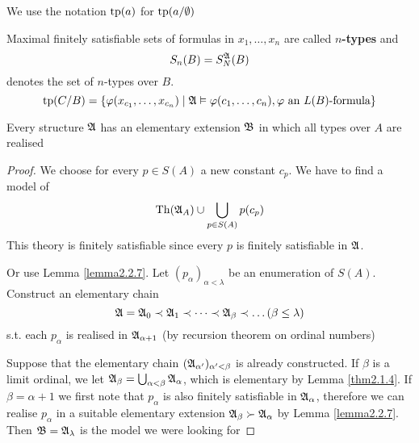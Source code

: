 \documentclass[11pt]{article}
\begin{document}
We use the notation \(\operatorname{tp}(a)\) for \(\operatorname{tp}(a/\emptyset)\)

Maximal finitely satisfiable sets of formulas in \(x_1,\dots,x_n\) are called
\textbf{\(n\)-types} and
\begin{equation*}
S_n(B)=S_N^{\mathfrak{A}}(B)
\end{equation*}
denotes the set of \(n\)-types over \(B\).
\begin{equation*}
\operatorname{tp}(C/B)=\{\varphi(x_{c_1},\dots,x_{c_n})\mid\mathfrak{A}\vDash\varphi(c_1,\dots,c_n),\varphi
\text{ an $L(B)$-formula}\}
\end{equation*}

\begin{corollary}[]
\label{cor2.2.9}
Every structure \(\mathfrak{A}\) has an elementary extension \(\mathfrak{B}\) in which all
types over \(A\) are realised
\end{corollary}

\begin{proof}
We choose for every \(p\in S(A)\) a new constant \(c_p\). We have to find a
model of
\begin{equation*}
\operatorname{Th}(\mathfrak{A}_A)\cup\bigcup_{p\in S(A)}p(c_p)
\end{equation*}
This theory is finitely satisfiable since every \(p\) is finitely satisfiable
in \(\mathfrak{A}\).

Or use Lemma \ref{lemma2.2.7}. Let \((p_\alpha)_{\alpha<\lambda}\) be an enumeration of
\(S(A)\). Construct an elementary chain
\begin{equation*}
\mathfrak{A}=\mathfrak{A}_0\prec\mathfrak{A}_1\prec\dots\prec\mathfrak{A}_\beta\prec\dots(\beta\le\lambda)
\end{equation*}
s.t. each \(p_\alpha\) is realised in \(\mathfrak{A}_{\alpha+1}\) (by recursion
theorem on ordinal numbers)

Suppose that the elementary chain \((\mathfrak{A}_{\alpha'})_{\alpha'<\beta}\) is already
constructed. If \(\beta\) is a limit ordinal, we let
\(\mathfrak{A}_\beta=\bigcup_{\alpha<\beta}\mathfrak{A}_\alpha\), which is elementary by Lemma \ref{thm2.1.4}. If
\(\beta=\alpha+1\) we  first note that \(p_\alpha\) is also finitely
satisfiable in \(\mathfrak{A}_\alpha\), therefore we can realise \(p_\alpha\) in a
suitable elementary extension \(\mathfrak{A}_\beta\succ\mathfrak{A}_\alpha\) by Lemma
\ref{lemma2.2.7}. Then \(\mathfrak{B}=\mathfrak{A}_\lambda\) is the model we were looking for
\end{proof}
\end{document}
